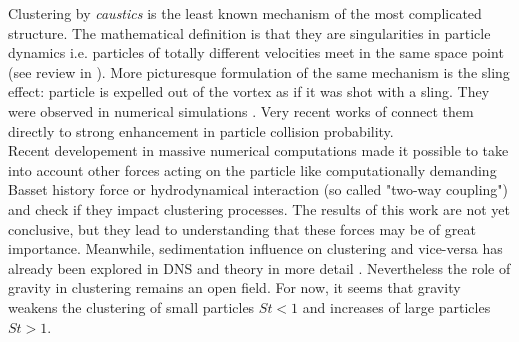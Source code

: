 \documentclass[../main.tex]{subfiles}
\begin{document}
 Clustering by \emph{caustics} is the least known mechanism of the most complicated structure. The mathematical definition is that they are singularities in particle dynamics i.e. particles of totally different velocities meet in the same space point (see review in \citet{Gustavsson2016}). More picturesque formulation of the same mechanism is the sling effect: particle is expelled out of the vortex as if it was shot with a sling. They were observed in numerical simulations \citep{Marcu1995, Falkovich2007, Bec2011, Bewley2013}. Very recent works of \citet{Ravichandran2015, Deepu2017} connect them directly to strong enhancement in particle collision probability.
\\
Recent developement in massive numerical computations made it possible to take into account other forces acting on the particle like computationally demanding Basset history force \citep{Olivieri2014} or hydrodynamical interaction \citep{Monchaux2017, Yavuz2018} (so called "two-way coupling") and check if they impact clustering processes. The results of this work are not yet conclusive, but they lead to understanding that these forces may be of great importance. Meanwhile, sedimentation influence on clustering and vice-versa has already been explored in DNS and theory in more detail \citep{Wang2006, Ayala2008, Woittiez2009, Dejoan2013, Gustavsson2014, Bec2014, Park2014, Bragg2015b, Rosa2016, Ireland2016b, Rosa_Pozorski2017,Baker2017, Tom2019, Momenifar2019}. Nevertheless the role of gravity in clustering remains an open field. For now, it seems that gravity weakens the clustering of small particles $St<1$ and increases of large particles $St>1$.
\\
\end{document}
